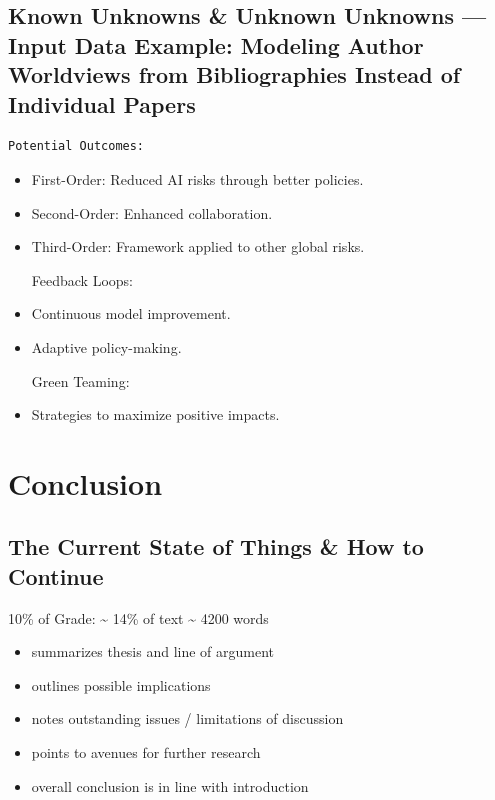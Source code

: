 \documentclass[
  letterpaper,
]{book}
\providecommand{\tightlist}{%
  \setlength{\itemsep}{0pt}\setlength{\parskip}{0pt}}
\begin{document}
\section{Known Unknowns \& Unknown Unknowns --- Input Data Example:
Modeling Author Worldviews from Bibliographies Instead of Individual
Papers}\label{known-unknowns-unknown-unknowns-input-data-example-modeling-author-worldviews-from-bibliographies-instead-of-individual-papers}

\begin{verbatim}
Potential Outcomes:
\end{verbatim}

\begin{itemize}
\item
  First-Order: Reduced AI risks through better policies.\\
\item
  Second-Order: Enhanced collaboration.\\
\item
  Third-Order: Framework applied to other global risks.

  Feedback Loops:
\item
  Continuous model improvement.\\
\item
  Adaptive policy-making.

  Green Teaming:
\item
  Strategies to maximize positive impacts.
\end{itemize}


\chapter{Conclusion}\label{conclusion}

\section{The Current State of Things \& How to
Continue}\label{the-current-state-of-things-how-to-continue}

10\% of Grade: \textasciitilde{} 14\% of text \textasciitilde{} 4200
words

\begin{itemize}
\tightlist
\item
  summarizes thesis and line of argument
\item
  outlines possible implications
\item
  notes outstanding issues / limitations of discussion
\item
  points to avenues for further research
\item
  overall conclusion is in line with introduction
\end{itemize}
\end{document}
